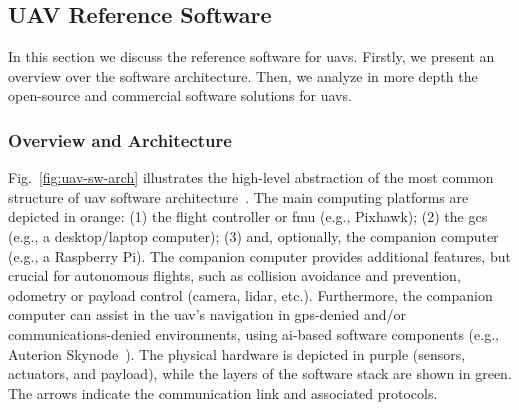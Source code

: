 \subsection{UAV Reference Software}%
\label{sec:uav-ref-sw}
In this section we discuss the reference software for \glspl{uav}.
Firstly, we present an overview over the software architecture. Then, we analyze
in more depth the open-source and commercial software solutions for \glspl{uav}.

\subsubsection{Overview and Architecture}%
\label{sec:overv-arch-sw}
Fig.~\ref{fig:uav-sw-arch} illustrates the high-level abstraction of the
most common structure of \gls{uav} software
architecture~\cite{leccadito2018survey,px4-sysArch}.
%
The main computing platforms are depicted in orange: (1) the flight controller
or \gls{fmu} (e.g., Pixhawk); (2) the \gls{gcs} (e.g., a desktop/laptop computer);
(3) and, optionally, the companion computer (e.g., a Raspberry Pi).
The companion computer provides additional features, but crucial for autonomous
flights, such as collision avoidance and prevention, odometry or payload control
(camera, \gls{lidar}, etc.). Furthermore, the companion computer can assist in
the \gls{uav}'s navigation in \gls{gps}-denied and/or communications-denied
environments, using \gls{ai}-based software components (e.g., Auterion
Skynode~\cite{skynodeS-noJamming}).
%
The physical hardware is depicted in purple (sensors, actuators, and payload),
while the layers of the software stack are shown in green. The arrows indicate the communication link and
associated protocols.

